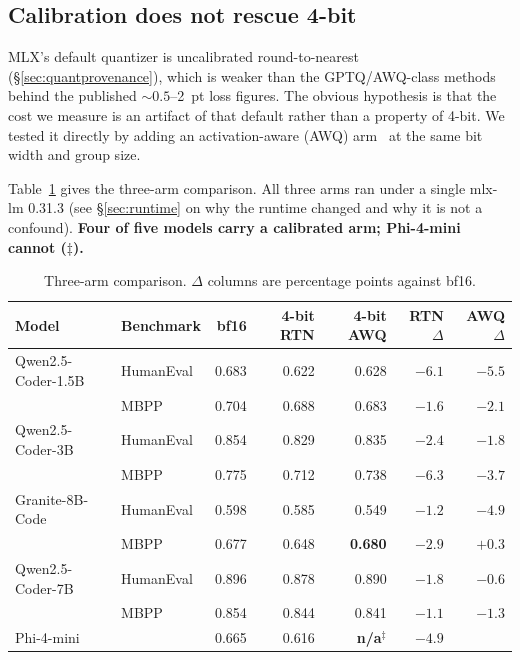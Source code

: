 \documentclass[11pt]{article}
\begin{document}
\subsection{Calibration does not rescue 4-bit}
\label{sec:calibration}

MLX's default quantizer is uncalibrated round-to-nearest (\S\ref{sec:quantprovenance}),
which is weaker than the GPTQ/AWQ-class methods behind the published
${\sim}0.5$--2~pt loss figures. The obvious hypothesis is that the cost we measure is an
artifact of that default rather than a property of 4-bit. We tested it directly by adding
an activation-aware (AWQ) arm~\citep{lin2024awq} at the same bit width and group size.

Table~\ref{tab:threearm} gives the three-arm comparison. All three arms ran under a single mlx-lm 0.31.3 (see \S\ref{sec:runtime} on why the
runtime changed and why it is not a confound). \textbf{Four of five models carry a
calibrated arm; Phi-4-mini cannot ($\ddagger$).}

\begin{table}[h]
  \centering
  \caption{Three-arm comparison. $\Delta$ columns are percentage points against bf16.}
  \label{tab:threearm}
  \smallskip
  \small
  \setlength{\tabcolsep}{5pt}
  \begin{tabular}{llrrrrr}
    \toprule
    Model & Benchmark & bf16 & 4-bit RTN & 4-bit AWQ & RTN $\Delta$ & AWQ $\Delta$ \\
    \midrule
    Qwen2.5-Coder-1.5B & HumanEval & 0.683 & 0.622 & 0.628 & $-6.1$ & $-5.5$ \\
                       & MBPP      & 0.704 & 0.688 & 0.683 & $-1.6$ & $-2.1$ \\
    Qwen2.5-Coder-3B   & HumanEval & 0.854 & 0.829 & 0.835 & $-2.4$ & $-1.8$ \\
                       & MBPP      & 0.775 & 0.712 & 0.738 & $-6.3$ & $-3.7$ \\
    Granite-8B-Code    & HumanEval & 0.598 & 0.585 & 0.549 & $-1.2$ & $-4.9$ \\
                       & MBPP      & 0.677 & 0.648 & \textbf{0.680} & $-2.9$ & $\mathbf{+0.3}$ \\
    Qwen2.5-Coder-7B   & HumanEval & 0.896 & 0.878 & 0.890 & $-1.8$ & $-0.6$ \\
                       & MBPP      & 0.854 & 0.844 & 0.841 & $-1.1$ & $-1.3$ \\
    Phi-4-mini         &           & 0.665 & 0.616 & \textbf{n/a}$^\ddagger$ & $-4.9$ & \\
    \bottomrule
  \end{tabular}
\end{table}
\end{document}
